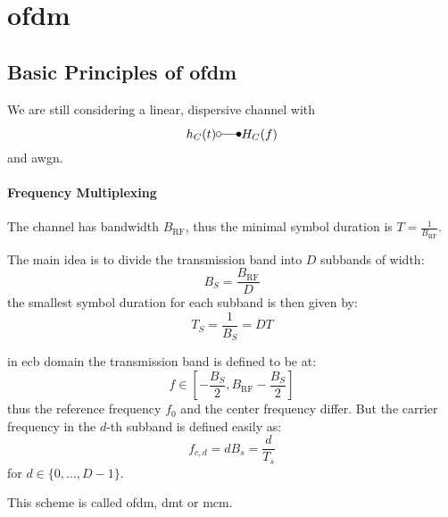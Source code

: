 \chapter{\acl{ofdm}}
\section{Basic Principles of \acl{ofdm}}
We are still considering a linear, dispersive channel with
\begin{equation}
    h_C(t) \laplace H_C(f)
\end{equation}
and \ac{awgn}.

\subsubsection{Frequency Multiplexing}
    The channel has bandwidth $B_\text{RF}$, thus the minimal symbol duration is $T=\frac{1}{B_\text{RF}}$. 

The main idea is to divide the transmission band into $D$ subbands of width:
\begin{equation}
    B_S = \frac{B_\text{RF}}{D}
\end{equation}
the smallest symbol duration for each subband is then given by:
\begin{equation}
    T_S = \frac{1}{B_S} = D T
\end{equation}

in \ac{ecb} domain the transmission band is defined to be at:
\begin{equation}
    f \in \left[-\frac{B_S}{2}, B_\text{RF} - \frac{B_S}{2}\right]
\end{equation}
thus the reference frequency $f_0$ and the center frequency differ. But the 
carrier frequency in the $d$-th subband is defined easily as:
\begin{equation}
    f_{c,d} = d B_s = \frac{d}{T_s}
\end{equation}
for $d \in \{0, \ldots, D-1\}$.

This scheme is called \ac{ofdm}, \ac{dmt} or \ac{mcm}.

